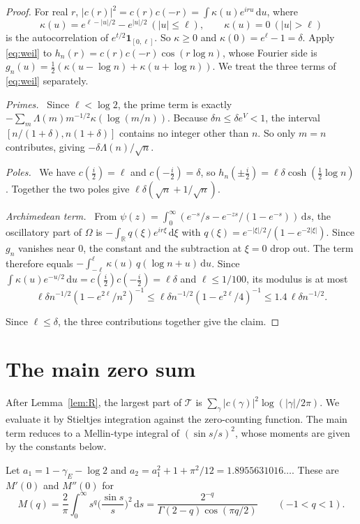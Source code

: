 \documentclass[11pt]{amsart}
\theoremstyle{remark}
\newcommand{\dd}{\,\mathrm{d}}
\newcommand{\step}[1]{\smallskip\noindent\textit{#1.}\ }
\begin{document}
\begin{proof}
For real $r$, $|c(r)|^2=c(r)c(-r)=\int\kappa(u)e^{iru}\dd u$, where
\[
\kappa(u)=e^{\ell-|u|/2}-e^{|u|/2}\ (|u|\le\ell),\qquad \kappa(u)=0\ (|u|>\ell)
\]
is the autocorrelation of $e^{t/2}\mathbf 1_{[0,\ell]}$. So $\kappa\ge0$ and $\kappa(0)=e^\ell-1=\delta$. Apply \eqref{eq:weil} to $h_n(r)=c(r)c(-r)\cos(r\log n)$, whose Fourier side is $g_n(u)=\frac12(\kappa(u-\log n)+\kappa(u+\log n))$. We treat the three terms of \eqref{eq:weil} separately.

\step{Primes} Since $\ell<\log2$, the prime term is exactly $-\sum_m\Lambda(m)m^{-1/2}\kappa(\log(m/n))$. Because $\delta n\le\delta e^V<1$, the interval $[n/(1+\delta),n(1+\delta)]$ contains no integer other than $n$. So only $m=n$ contributes, giving $-\delta\Lambda(n)/\sqrt n$.

\step{Poles} We have $c(\frac i2)=\ell$ and $c(-\frac i2)=\delta$, so $h_n(\pm\frac i2)=\ell\delta\cosh(\frac12\log n)$. Together the two poles give $\ell\delta(\sqrt n+1/\sqrt n)$.

\step{Archimedean term} From $\psi(z)=\int_0^\infty(e^{-s}/s-e^{-zs}/(1-e^{-s}))\dd s$, the oscillatory part of $\Omega$ is $-\int_{\mathbb R}q(\xi)e^{ir\xi}\dd\xi$ with $q(\xi)=e^{-|\xi|/2}/(1-e^{-2|\xi|})$. Since $g_n$ vanishes near $0$, the constant and the subtraction at $\xi=0$ drop out. The term therefore equals $-\int_{-\ell}^{\ell}\kappa(u)\,q(\log n+u)\dd u$. Since $\int\kappa(u)e^{-u/2}\dd u=c(\frac i2)c(-\frac i2)=\ell\delta$ and $\ell\le1/100$, its modulus is at most
\[
\ell\delta n^{-1/2}(1-e^{2\ell}/n^2)^{-1}\le\ell\delta n^{-1/2}(1-e^{2\ell}/4)^{-1}\le1.4\,\ell\delta n^{-1/2}.
\]

Since $\ell\le\delta$, the three contributions together give the claim.
\end{proof}

\section{The main zero sum}\label{sec:main}

After Lemma~\ref{lem:R}, the largest part of $\mathcal T$ is $\sum_\gamma|c(\gamma)|^2\log(|\gamma|/2\pi)$. We evaluate it by Stieltjes integration against the zero-counting function. The main term reduces to a Mellin-type integral of $(\sin s/s)^2$, whose moments are given by the constants below.

Let $a_1=1-\gamma_E-\log2$ and $a_2=a_1^2+1+\pi^2/12=1.8955631016\ldots$. These are $M'(0)$ and $M''(0)$ for
\[
M(q)=\frac2\pi\int_0^\infty s^q\Big(\frac{\sin s}s\Big)^2\dd s=\frac{2^{-q}}{\Gamma(2-q)\cos(\pi q/2)}\qquad(-1<q<1).
\]
\end{document}
